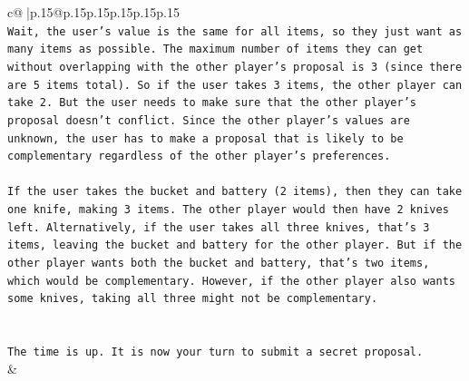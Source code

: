 \documentclass{article}
\begin{document}
{\begin{supertabular}{c@{$\;$}|p{.15\linewidth}@{}p{.15\linewidth}p{.15\linewidth}p{.15\linewidth}p{.15\linewidth}p{.15\linewidth}}
{{{\\ 
\texttt{Wait, the user's value is the same for all items, so they just want as many items as possible. The maximum number of items they can get without overlapping with the other player's proposal is 3 (since there are 5 items total). So if the user takes 3 items, the other player can take 2. But the user needs to make sure that the other player's proposal doesn't conflict. Since the other player's values are unknown, the user has to make a proposal that is likely to be complementary regardless of the other player's preferences.} \\
\\ 
\texttt{If the user takes the bucket and battery (2 items), then they can take one knife, making 3 items. The other player would then have 2 knives left. Alternatively, if the user takes all three knives, that's 3 items, leaving the bucket and battery for the other player. But if the other player wants both the bucket and battery, that's two items, which would be complementary. However, if the other player also wants some knives, taking all three might not be complementary.} \\
\\ 
\\ 
\texttt{The time is up. It is now your turn to submit a secret proposal.} \\
            }
        }
    }
    & \\ \\


\end{supertabular}}
\end{document}
